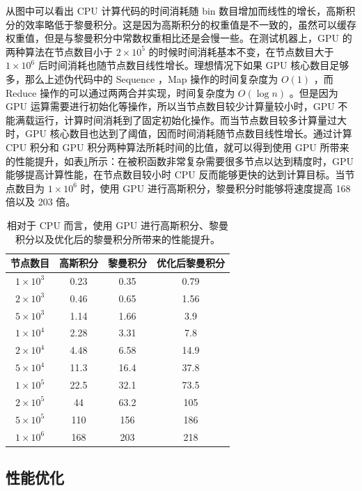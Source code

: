 从图中可以看出 CPU 计算代码的时间消耗随 bin 数目增加而线性的增长，高斯积分的效率略低于黎曼积分。这是因为高斯积分的权重值是不一致的，虽然可以缓存权重值，但是与黎曼积分中常数权重相比还是会慢一些。在测试机器上，GPU 的两种算法在节点数目小于 $2\times10^5$ 的时候时间消耗基本不变，在节点数目大于 $1\times10^6$ 后时间消耗也随节点数目线性增长。理想情况下如果 GPU 核心数目足够多，那么上述伪代码中的 Sequence ，Map 操作的时间复杂度为 $O(1)$ ，而 Reduce 操作的可以通过两两合并实现，时间复杂度为 $O(\log{n})$ 。但是因为 GPU 运算需要进行初始化等操作，所以当节点数目较少计算量较小时，GPU 不能满载运行，计算时间消耗到了固定初始化操作。而当节点数目较多计算量过大时，GPU 核心数目也达到了阈值，因而时间消耗随节点数目线性增长。通过计算 CPU 积分和 GPU 积分两种算法所耗时间的比值，就可以得到使用 GPU 所带来的性能提升，如表\ref{tab:cuda_2}所示：在被积函数非常复杂需要很多节点以达到精度时，GPU 能够提高计算性能，在节点数目较小时 CPU 反而能够更快的达到计算目标。当节点数目为 $1\times10^6$ 时，使用 GPU 进行高斯积分，黎曼积分时能够将速度提高 168 倍以及 203 倍。

\begin{table}
    \centering
    \caption{相对于 CPU 而言，使用 GPU 进行高斯积分、黎曼积分以及优化后的黎曼积分所带来的性能提升。}
    \begin{tabular*}{0.8\textwidth}{@{\extracolsep{\fill}}cccc}
        \hline
        \hline							
        节点数目	&	高斯积分	&	黎曼积分	&	优化后黎曼积分	\\\hline
        $1\times10^3$	&	0.23	&	0.35	&	0.79	\\
        $2\times10^3$	&	0.46	&	0.65	&	1.56	\\
        $5\times10^3$	&	1.14	&	1.66	&	3.9	\\
        $1\times10^4$	&	2.28	&	3.31	&	7.8	\\
        $2\times10^4$	&	4.48	&	6.58	&	14.9	\\
        $5\times10^4$	&	11.3	&	16.4	&	37.8	\\
        $1\times10^5$	&	22.5	&	32.1	&	73.5	\\
        $2\times10^5$	&	44	&	63.2	&	105	\\
        $5\times10^5$	&	110	&	156	&	186	\\
        $1\times10^6$	&	168	&	203	&	218	\\
        \hline
        \hline
    \end{tabular*}
    \label{tab:cuda_2}
\end{table}


\subsection{性能优化}

